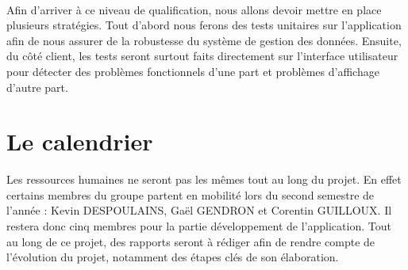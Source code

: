 \paragraph{}

Afin d’arriver à ce niveau de qualification, nous allons devoir mettre en place plusieurs  stratégies. Tout d’abord nous ferons des tests unitaires sur l’application afin de nous assurer de la robustesse du système de gestion des données. Ensuite, du côté client, les tests seront surtout faits directement sur l’interface utilisateur pour détecter des problèmes fonctionnels d’une part et problèmes d’affichage d’autre part.

\section{Le calendrier}

Les ressources humaines ne seront pas les mêmes tout au long du projet. En effet certains membres du groupe partent en mobilité lors du second semestre de l’année : Kevin DESPOULAINS, Gaël GENDRON et Corentin GUILLOUX. Il restera donc cinq membres pour la partie développement de l’application. Tout au long de ce projet, des rapports seront à rédiger afin de rendre compte de l’évolution du projet, notamment des étapes clés de son élaboration.

